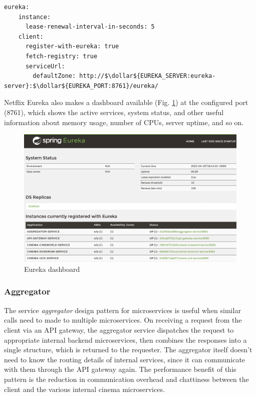 \begin{lstlisting}[caption=Snippet from a Eureka client's application properties]
  eureka:
    instance:
      lease-renewal-interval-in-seconds: 5
    client:
      register-with-eureka: true
      fetch-registry: true
      serviceUrl:
        defaultZone: http://$\dollar${EUREKA_SERVER:eureka-server}:$\dollar${EUREKA_PORT:8761}/eureka/
\end{lstlisting}

Netflix Eureka also makes a dashboard available (Fig. \ref{fig:eureka-dashboard}) at the configured port (8761), which shows the active services, system status, and other useful information about memory usage, number of CPUs, server uptime, and so on.

\begin{figure}[H]
	\centering
	\includegraphics[width=1.0\linewidth]{./assets/images/case-studies/eureka-dashboard.png}
	\caption{Eureka dashboard}
	\label{fig:eureka-dashboard}
\end{figure}

\subsubsection{Aggregator}

The service \textit{aggregator} design pattern for microservices is useful when similar calls need to made to multiple microservices. On receiving a request from the client via an API gateway, the aggregator service dispatches the request to appropriate internal backend microservices, then combines the responses into a single structure, which is returned to the requester. The aggregator itself doesn't need to know the routing details of internal services, since it can communicate with them through the API gateway again. The performance benefit of this pattern is the reduction in communication overhead and chattiness between the client and the various internal cinema microservices.

